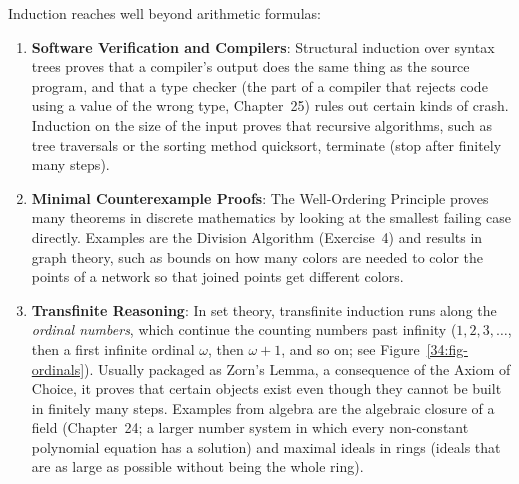 Induction reaches well beyond arithmetic formulas:
\begin{enumerate}
  \item \textbf{Software Verification and Compilers}: Structural induction over syntax trees proves that a compiler's output does the same thing as the source program, and that a type checker (the part of a compiler that rejects code using a value of the wrong type, Chapter~25) rules out certain kinds of crash. Induction on the size of the input proves that recursive algorithms, such as tree traversals or the sorting method quicksort, terminate (stop after finitely many steps).
  \item \textbf{Minimal Counterexample Proofs}: The Well-Ordering Principle proves many theorems in discrete mathematics by looking at the smallest failing case directly. Examples are the Division Algorithm (Exercise~4) and results in graph theory, such as bounds on how many colors are needed to color the points of a network so that joined points get different colors.
  \item \textbf{Transfinite Reasoning}: In set theory, transfinite induction runs along the \emph{ordinal numbers}, which continue the counting numbers past infinity ($1, 2, 3, \dots$, then a first infinite ordinal $\omega$, then $\omega + 1$, and so on; see Figure~\ref{34:fig-ordinals}). Usually packaged as Zorn's Lemma, a consequence of the Axiom of Choice, it proves that certain objects exist even though they cannot be built in finitely many steps. Examples from algebra are the algebraic closure of a field (Chapter~24; a larger number system in which every non-constant polynomial equation has a solution) and maximal ideals in rings (ideals that are as large as possible without being the whole ring).
\end{enumerate}

